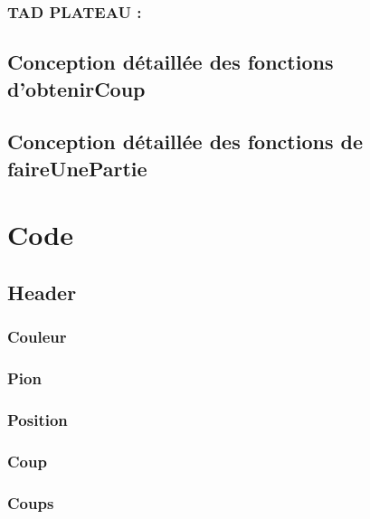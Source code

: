 \documentclass{article}
\begin{document}
\subsubsection{TAD PLATEAU :}


\subsection{Conception détaillée des fonctions d'obtenirCoup}


\subsection{Conception détaillée des fonctions de faireUnePartie}





\section{Code}

\subsection{Header}

\subsubsection{Couleur}


\subsubsection{Pion}


\subsubsection{Position}


\subsubsection{Coup}


\subsubsection{Coups}

\end{document}
